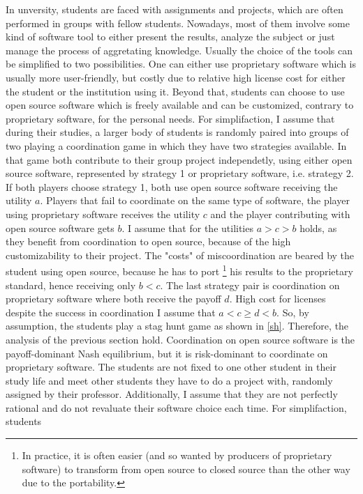 \documentclass[11pt]{article}
\begin{document}
In unversity, students are faced with assignments and projects, which are 
often performed in groups with fellow students.
Nowadays, most of them involve some kind of software tool to either present 
the results, analyze the subject or just manage the process of aggretating 
knowledge. Usually the choice of the tools can be simplified to two 
possibilities. One can either use proprietary software
which is usually more user-friendly, but costly due to relative high 
license cost for either the student or the institution using it. 
Beyond that, students can choose to use open source software which is freely
available and can be customized, contrary to proprietary software,
for the personal needs. 
For simplifaction, I assume that during their studies, a larger body of 
students is randomly paired into groups of two playing a coordination game
in which they have two strategies available. In that game both contribute 
to their group project independetly, using either open source software, 
represented by strategy 1 or proprietary software, i.e. strategy 2.
If both players choose strategy 1, both use open source software receiving 
the utility $a$. Players that fail to coordinate on the same type of
software, the player using proprietary software receives the utility $c$ and
the player contributing with open source software gets $b$. I assume that 
for the utilities $a>c>b$ holds, 
as they benefit from coordination to open source,
because of the high customizability to their project. The "costs" of 
miscoordination are beared by the student using open source, because he has
to port \footnote{In practice, it is
often easier (and so wanted by producers of proprietary software) to
transform from open source to closed source than the other way due to the
portability.} his results to the proprietary standard, hence receiving only
$b < c$. The last strategy pair is coordination on proprietary software where
both receive the payoff $d$. High cost for licenses despite the success 
in coordination I assume that $a<c\geq d<b$. So, by assumption, the students
play a stag hunt game as shown in \ref{sh}.
Therefore, the analysis of the previous section hold. Coordination on open
source software is the payoff-dominant Nash equilibrium, but it is 
risk-dominant to coordinate on proprietary software. 
The students are not fixed to one other student in their study life and
meet other students they have to do a project with, randomly assigned by their
professor. Additionally, I assume that they are not perfectly rational and
do not revaluate their software choice each time. For simplifaction, students
\end{document}
